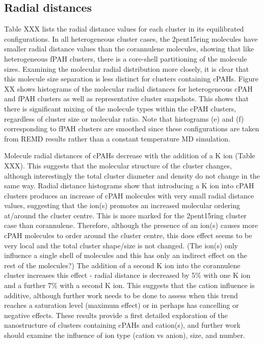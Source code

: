 

\subsection{Radial distances}
Table XXX lists the radial distance values for each cluster in its equilibrated configurations. In all heterogeneous cluster cases, the 2pent15ring molecules have smaller radial distance values than the corannulene molecules, showing that like heterogeneous fPAH clusters, there is a core-shell partitioning of the molecule sizes. 
Examining the molecular radial distribution more closely, it is clear that this molecule size separation is less distinct for clusters containing cPAHs. Figure XX shows histograms of the molecular radial distances for heterogeneous cPAH and fPAH clusters as well as representative cluster snapshots. This shows that there is significant mixing of the molecule types within the cPAH clusters, regardless of cluster size or molecular ratio.
Note that histograms (e) and (f) corresponding to fPAH clusters are smoothed since these configurations are taken from REMD results rather than a constant temperature MD simulation.

Molecule radial distances of cPAHs decrease %
with the addition of a K ion (Table XXX). This suggests that the molecular structure of the cluster changes, although interestingly the total cluster diameter and density do not change in the same way. Radial distance histograms show that introducing a K ion into cPAH clusters produces an increase of cPAH molecules with very small radial distance values, suggesting that the ion(s) promotes an increased molecular ordering at/around the cluster centre. This is more marked for the 2pent15ring cluster case than corannulene. Therefore, although the presence of an ion(s) causes more cPAH molecules to order around the cluster centre, this does effect seems to be very local and the total cluster shape/size is not changed.  (The ion(s) only influence a single shell of molecules and this has only an indirect effect on the rest of the molecules?)
The addition of a second K ion into the corannulene cluster increases this effect - radial distance is decreased by 5\% with one K ion and a further 7\% with a second K ion. This suggests that the cation influence is additive, although further work needs to be done to assess when this trend reaches a saturation level (maximum effect) or in perhaps has cancelling or negative effects.
These results provide a first detailed exploration of the nanostructure of clusters containing cPAHs and cation(s), and further work should examine the influence of ion type (cation vs anion), size, and number.


